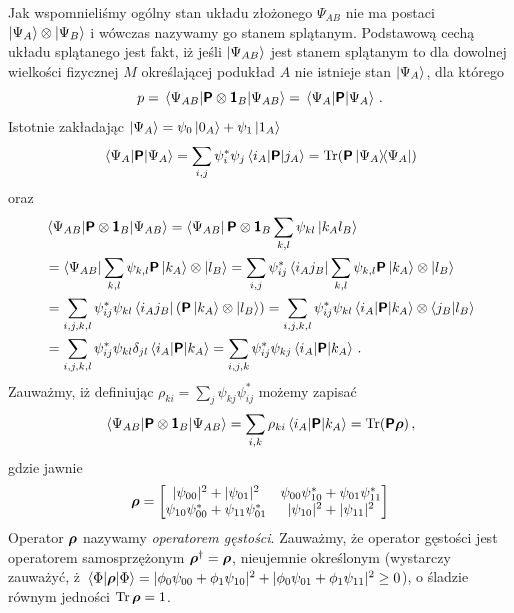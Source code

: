 \documentclass{myclass}
\begin{document}
Jak wspomnieliśmy ogólny stan układu złożonego \(\Psi_{AB}\) nie ma postaci
\(\ket{\Psi_A}\otimes\ket{\Psi_B}\) i wówczas nazywamy go stanem splątanym. Podstawową cechą układu
splątanego jest fakt, iż jeśli \(\ket{\Psi_{AB}}\) jest stanem splątanym to dla dowolnej wielkości
fizycznej \(M\) określającej podukład \(A\) nie istnieje stan \(\ket{\Psi_A}\), dla którego
\begin{equation*}
    p = \mel{\Psi_{AB}}{\boldsymbol{\mathsf{P}}\otimes\boldsymbol{\mathsf{1}}_B}{\Psi_{AB}} = \mel{\Psi_A}{\boldsymbol{\mathsf{P}}}{\Psi_A}\,.
\end{equation*}
Istotnie zakładając \(\ket{\Psi_A} = \psi_0\ket{0_A} + \psi_1\ket{1_A}\)
\begin{equation*}
    \mel{\Psi_A}{\oper{P}}{\Psi_A} = \sum_{i,j} \psi_i^*\psi_j \mel{i_A}{\oper{P}}{j_A} = \Tr(\oper{P}\dyad{\Psi_A})
\end{equation*}
oraz
\begin{equation*}
    \begin{split}
        &\mel{\Psi_{AB}}{\boldsymbol{\mathsf{P}}\otimes\boldsymbol{\mathsf{1}}_B}{\Psi_{AB}} = \bra{\Psi_{AB}}\boldsymbol{\mathsf{P}}\otimes\boldsymbol{\mathsf{1}}_B\sum_{k,l}\psi_{kl}\ket{k_Al_B} \\
        &= \bra{\Psi_{AB}}\sum_{k,l}\psi_{k,l}\boldsymbol{\mathsf{P}}\ket{k_A}\otimes\ket{l_B} = \sum_{i,j}\psi_{ij}^*\bra{i_Aj_B}\sum_{k,l}\psi_{k,l}\boldsymbol{\mathsf{P}}\ket{k_A}\otimes\ket{l_B} \\
        &= \sum_{i,j,k,l}\psi_{ij}^*\psi_{kl}\bra{i_Aj_B}\left(\boldsymbol{\mathsf{P}}\ket{k_A}\otimes\ket{l_B}\right) = \sum_{i,j,k,l}\psi_{ij}^*\psi_{kl}\mel{i_A}{\boldsymbol{\mathsf{P}}}{k_A}\otimes \braket{j_B}{l_B} \\
        &= \sum_{i,j,k,l}\psi_{ij}^*\psi_{kl}\delta_{jl} \mel{i_A}{\boldsymbol{\mathsf{P}}}{k_A} = \sum_{i,j,k} \psi_{ij}^*\psi_{kj} \mel{i_A}{\boldsymbol{\mathsf{P}}}{k_A}\,.
    \end{split}
\end{equation*}
Zauważmy, iż definiując \(\rho_{ki} = \sum_{j} \psi_{kj}\psi_{ij}^*\) możemy zapisać
\begin{equation*}
    \mel{\Psi_{AB}}{\oper{P}\otimes\oper{1}_B}{\Psi_{AB}} = \sum_{i,k}\rho_{ki}\mel{i_A}{\oper{P}}{k_A} = \Trace(\oper{P}\oper{\rho})\,,
\end{equation*}
gdzie jawnie
\begin{equation*}
    \oper{\rho} = \mqty[|\psi_{00}|^2 + |\psi_{01}|^2 & \psi_{00}\psi_{10}^* + \psi_{01}\psi_{11}^*\\ \psi_{10}\psi_{00}^* + \psi_{11}\psi_{01}^* & |\psi_{10}|^2 + |\psi_{11}|^2]
\end{equation*}
Operator \(\boldsymbol{\mathsf{\rho}}\) nazywamy \textit{operatorem gęstości}. Zauważmy, że operator gęstości jest
operatorem samosprzężonym \(\boldsymbol{\mathsf{\rho}}^\dagger = \boldsymbol{\mathsf{\rho}}\), nieujemnie określonym (wystarczy
zauważyć, ż \(\mel{\Phi}{\boldsymbol{\mathsf{\rho}}}{\Phi} = |\phi_0\psi_{00} + \phi_1\psi_{10}|^2 +
|\phi_0\psi_{01}+\phi_1\psi_{11}|^2 \geq 0\)), o śladzie równym jedności \(\Trace\oper{\rho} = 1\).
\end{document}
